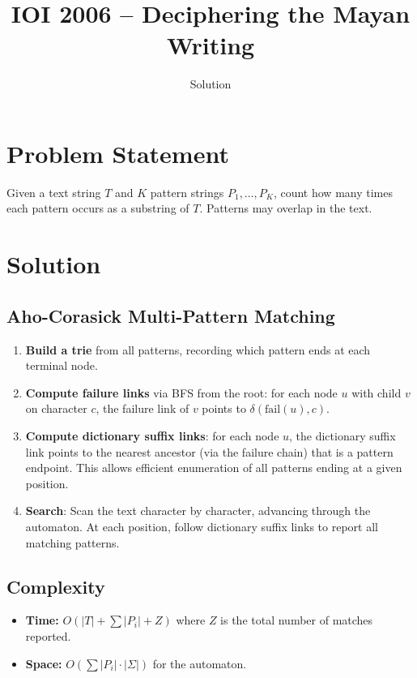 \documentclass[11pt,a4paper]{article}
\title{IOI 2006 -- Deciphering the Mayan Writing}
\author{Solution}
\date{}
\begin{document}
\maketitle

\section{Problem Statement}
Given a text string $T$ and $K$ pattern strings $P_1, \ldots, P_K$, count how many times each pattern occurs as a substring of $T$. Patterns may overlap in the text.

\section{Solution}

\subsection{Aho-Corasick Multi-Pattern Matching}
\begin{enumerate}
    \item \textbf{Build a trie} from all patterns, recording which pattern ends at each terminal node.
    \item \textbf{Compute failure links} via BFS from the root: for each node $u$ with child $v$ on character $c$, the failure link of $v$ points to $\delta(\text{fail}(u), c)$.
    \item \textbf{Compute dictionary suffix links}: for each node $u$, the dictionary suffix link points to the nearest ancestor (via the failure chain) that is a pattern endpoint. This allows efficient enumeration of all patterns ending at a given position.
    \item \textbf{Search}: Scan the text character by character, advancing through the automaton. At each position, follow dictionary suffix links to report all matching patterns.
\end{enumerate}

\subsection{Complexity}
\begin{itemize}
    \item \textbf{Time:} $O(|T| + \sum |P_i| + Z)$ where $Z$ is the total number of matches reported.
    \item \textbf{Space:} $O(\sum |P_i| \cdot |\Sigma|)$ for the automaton.
\end{itemize}
\end{document}
